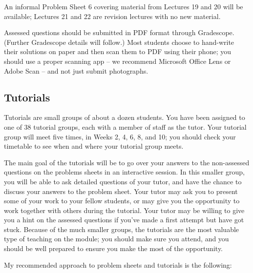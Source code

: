 \documentclass[
  a4paper,
]{book}
\theoremstyle{definition}
\theoremstyle{definition}
\theoremstyle{definition}
\theoremstyle{definition}
\theoremstyle{remark}
\begin{document}
An informal Problem Sheet 6 covering material from Lectures 19 and 20 will be available; Lectures 21 and 22 are revision lectures with no new material.

Assessed questions should be submitted in PDF format through Gradescope. (Further Gradescope details will follow.) Most students choose to hand-write their solutions on paper and then scan them to PDF using their phone; you should use a proper scanning app -- we recommend Microsoft Office Lens or Adobe Scan -- and not just submit photographs.

\hypertarget{tutorials}{%
\subsection*{Tutorials}\label{tutorials}}

Tutorials are small groups of about a dozen students. You have been assigned to one of 38 tutorial groups, each with a member of staff as the tutor. Your tutorial group will meet five times, in Weeks 2, 4, 6, 8, and 10; you should check your timetable to see when and where your tutorial group meets.

The main goal of the tutorials will be to go over your answers to the non-assessed questions on the problems sheets in an interactive session. In this smaller group, you will be able to ask detailed questions of your tutor, and have the chance to discuss your answers to the problem sheet. Your tutor may ask you to present some of your work to your fellow students, or may give you the opportunity to work together with others during the tutorial. Your tutor may be willing to give you a hint on the assessed questions if you've made a first attempt but have got stuck. Because of the much smaller groups, the tutorials are the most valuable type of teaching on the module; you should make sure you attend, and you should be well prepared to ensure you make the most of the opportunity.

My recommended approach to problem sheets and tutorials is the following:
\end{document}

